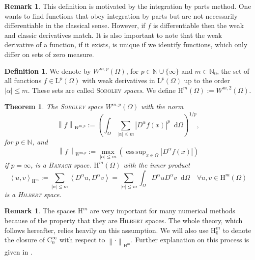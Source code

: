 \documentclass[12pt,a4paper,twoside, open=right]{scrreprt}
\theoremstyle{definition}
\newtheorem{rem}[auf]{Remark}
\newtheorem{defn}[auf]{Definition}
\theoremstyle{plain}
\newtheorem{sa}[auf]{Theorem}
\DeclareMathOperator*{\esssup}{ess\,sup} %
\newcommand{\abs}[1]{\left\vert #1\right\vert}
\newcommand{\dotp}[2]{\left\langle #1,#2\right\rangle}
\newcommand{\nn}{\mathbb{N}}
\newcommand{\norm}[1]{\left\lVert#1\right\rVert}
\newcommand{\D}{\mathop{}\!\mathrm{d}}
\begin{document}
\begin{rem}
    This definition is motivated by the integration by parts method. One wants to find functions that obey integration by parts but are not necessarily differentiable in the classical sense. However, if $f$ is differentiable then the weak and classic derivatives match. It is also important to note that the weak derivative of a function, if it exists, is unique if we identify functions, which only differ on sets of zero measure.
\end{rem}
\begin{defn}
    We denote by $W^{m,p}(\Omega)$, for $p\in\nn\cup\{\infty\}$ and $m\in\nn_0$, the set of all functions $f\in \mathrm{L}^p(\Omega)$ with weak derivatives in $\mathrm{L}^p(\Omega)$ up to the order $\abs{\alpha}\le m$. These sets are called \textsc{Sobolev} \emph{spaces}. We define $\mathrm{H}^m(\Omega):=W^{m,2}(\Omega)$.
\end{defn}
\begin{sa}
    The \textsc{Sobolev} space $W^{m,p}(\Omega)$ with the norm
    \begin{equation}
        \norm{f}_{W^{m,p}}:=\left(\int_\Omega\sum_{\abs{\alpha}\le m}\abs{D^{\alpha} f(x)}^p\D\Omega\right)^{1/p},
    \end{equation}
    for $p\in\nn$, and 
    \begin{equation}
        \norm{f}_{W^{m,p}}:=\max_{\abs{\alpha}\le m}\left(\esssup_{x\in\Omega}\abs{D^{\alpha}f(x)}\right)
    \end{equation}
    if $p=\infty$, is a \textsc{Banach} space. $\mathrm{H}^m(\Omega)$ with the inner product
    \begin{equation}
        \dotp{u}{v}_{\mathrm{H}^m}:=\sum_{\abs{\alpha}\le m}\dotp{D^{\alpha}u}{D^{\alpha}v}=\sum_{\abs{\alpha}\le m}\int_\Omega D^\alpha u D^\alpha v\D\Omega \quad \forall u,v\in \mathrm{H}^m(\Omega)
    \end{equation}
    is a \textsc{Hilbert} space.
\end{sa}
\begin{rem}
    The spaces $\mathrm{H}^m$ are very important for many numerical methods because of the property that they are \textsc{Hilbert} spaces. The whole theory, which follows hereafter, relies heavily on this assumption. We will also use $\mathrm{H}_0^m$ to denote the closure of $\mathrm{C}^\infty_0$ with respect to $\norm{\cdot}_{\mathrm{H}^m}$. Further explanation on this process is given in \cite{Jost2013}.
\end{rem}
\end{document}
